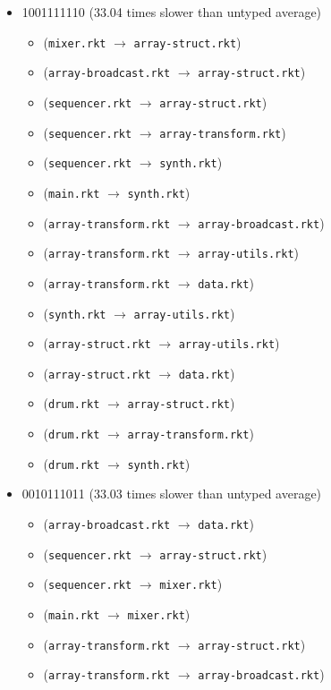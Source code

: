 \documentclass{article}
\newcommand{\mono}[1]{\texttt{#1}}
\begin{document}
\begin{itemize}
\begin{itemize}
  \end{itemize}
\item 1001111110 (33.04 times slower than untyped average)
  \begin{itemize}
  \item (\mono{mixer.rkt} $\rightarrow$ \mono{array-struct.rkt})
  \item (\mono{array-broadcast.rkt} $\rightarrow$ \mono{array-struct.rkt})
  \item (\mono{sequencer.rkt} $\rightarrow$ \mono{array-struct.rkt})
  \item (\mono{sequencer.rkt} $\rightarrow$ \mono{array-transform.rkt})
  \item (\mono{sequencer.rkt} $\rightarrow$ \mono{synth.rkt})
  \item (\mono{main.rkt} $\rightarrow$ \mono{synth.rkt})
  \item (\mono{array-transform.rkt} $\rightarrow$ \mono{array-broadcast.rkt})
  \item (\mono{array-transform.rkt} $\rightarrow$ \mono{array-utils.rkt})
  \item (\mono{array-transform.rkt} $\rightarrow$ \mono{data.rkt})
  \item (\mono{synth.rkt} $\rightarrow$ \mono{array-utils.rkt})
  \item (\mono{array-struct.rkt} $\rightarrow$ \mono{array-utils.rkt})
  \item (\mono{array-struct.rkt} $\rightarrow$ \mono{data.rkt})
  \item (\mono{drum.rkt} $\rightarrow$ \mono{array-struct.rkt})
  \item (\mono{drum.rkt} $\rightarrow$ \mono{array-transform.rkt})
  \item (\mono{drum.rkt} $\rightarrow$ \mono{synth.rkt})
  \end{itemize}
\item 0010111011 (33.03 times slower than untyped average)
  \begin{itemize}
  \item (\mono{array-broadcast.rkt} $\rightarrow$ \mono{data.rkt})
  \item (\mono{sequencer.rkt} $\rightarrow$ \mono{array-struct.rkt})
  \item (\mono{sequencer.rkt} $\rightarrow$ \mono{mixer.rkt})
  \item (\mono{main.rkt} $\rightarrow$ \mono{mixer.rkt})
  \item (\mono{array-transform.rkt} $\rightarrow$ \mono{array-struct.rkt})
  \item (\mono{array-transform.rkt} $\rightarrow$ \mono{array-broadcast.rkt})

\end{itemize}
\end{itemize}
\end{document}
